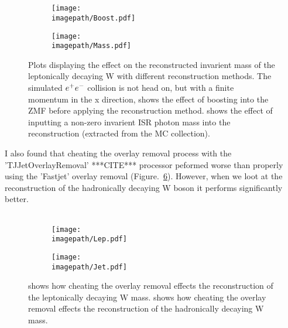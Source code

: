 \\\\
\begin{figure}
  \centering
  \begin{subfigure}[t]{0.45\textwidth}
    \centering
    \texttt{[image: \\imagepath/Boost.pdf]}
    \caption{}
    \label{SUBFIG:Boost}
  \end{subfigure}
  \begin{subfigure}[t]{0.45\textwidth}
    \centering
    \texttt{[image: \\imagepath/Mass.pdf]}
    \caption{}
    \label{SUBFIG:Mass}
  \end{subfigure}
  \caption{
    Plots displaying the effect on the reconstructed invarient mass of the leptonically decaying W with different reconstruction methods.
    The simulated $e^{+}e^{-}$ collision is not head on, but with a finite momentum in the x direction,  shows the effect of boosting into the ZMF before applying the reconstruction method.
     shows the effect of inputting a non-zero invarient ISR photon mass into the reconstruction (extracted from the MC collection).
    }
  \label{FIG:MyPlots}
\end{figure}
 I also found that cheating the overlay removal process with the 'TJJetOverlayRemoval' ***CITE*** processor peformed worse than properly using the 'Fastjet' overlay removal (Figure.~\ref{FIG:MyPlots2}). However, when we loot at the reconstruction of the hadronically decaying W boson it performs significantly better.
\\\\
\begin{figure}
    \begin{subfigure}[t]{0.45\textwidth}
      \centering
      \texttt{[image: \\imagepath/Lep.pdf]}
      \caption{}
      \label{SUBFIG:CheatLep}
    \end{subfigure}
    \begin{subfigure}[t]{0.45\textwidth}
      \centering
      \texttt{[image: \\imagepath/Jet.pdf]}
      \caption{}
      \label{SUBFIG:CheatHad}
    \end{subfigure}
    \caption{
       shows how cheating the overlay removal effects the reconstruction of the leptonically decaying W mass.
       shows how cheating the overlay removal effects the reconstruction of the hadronically decaying W mass.
      }
    \label{FIG:MyPlots2}
\end{figure}
